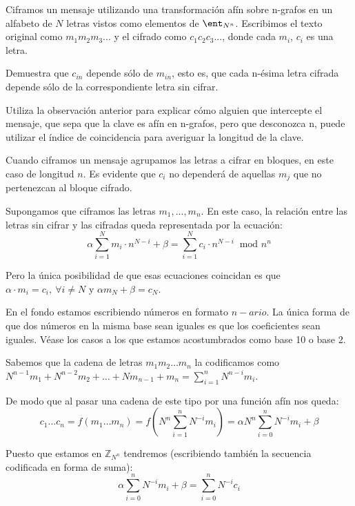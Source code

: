 \begin{problem}[2]
Ciframos un mensaje utilizando una transformación afín sobre n-grafos en un alfabeto de $N$ letras vistos como elementos de $\ent_{N^n}$. Escribimos el texto original como $m_1m_2m_3...$ y el cifrado como $c_1c_2c_3...$, donde cada $m_i$, $c_i$ es una letra.

\ppart Demuestra que $c_{in}$ depende sólo de $m_{in}$, esto es, que cada n-ésima letra cifrada depende sólo de la correspondiente letra sin cifrar.

\ppart Utiliza la observación anterior para explicar cómo alguien que intercepte el mensaje, que sepa que la clave es afín en n-grafos, pero que desconozca n, puede utilizar el índice de coincidencia para averiguar la longitud de la clave.

\solution


\spart
Cuando ciframos un mensaje agrupamos las letras a cifrar en bloques, en este caso de longitud $n$. Es evidente que $c_i$ no dependerá de aquellas $m_j$ que no pertenezcan al bloque cifrado.

Supongamos que ciframos las letras $m_1,...,m_n$. En este caso, la relación entre las letras sin cifrar y las cifradas queda representada por la ecuación:
\[α\sum_{i=1}^N m_i\cdot n^{N-i} + β= \sum_{i=1}^N c_i\cdot n^{N-i}\ \text{ mod } n^n\]

Pero la única posibilidad de que esas ecuaciones coincidan es que $α\cdot m_i=c_i, \ \forall i \neq N$ y $αm_N +β = c_N$.

\begin{remark}
En el fondo estamos escribiendo números en formato $n-ario$. La única forma de que dos números en la misma base sean iguales es que los coeficientes sean iguales. Véase los casos a los que estamos acostumbrados como base 10 o base 2.
\end{remark}


Sabemos que la cadena de letras $m_1m_2…m_n$ la codificamos como $N^{n-1}m_1 + N^{n-2}m_2 + … + Nm_{n-1} + m_n = \sum_{i=1}^n N^{n-i}m_i$.

De modo que al pasar una cadena de este tipo por una función afín nos queda:
\[c_1…c_n = f(m_1…m_n) = f\left(N^n \sum_{i=1}^n N^{-i} m_i\right) = αN^n \sum_{i=0}^nN^{-i}m_i + β\]

Puesto que estamos en $ℤ_{N^n}$ tendremos (escribiendo también la secuencia codificada en forma de suma):
\[α \sum_{i=0}^n N^{-i}m_i + β = \sum_{i=0}^n N^{-i}c_i\]


\end{problem}
